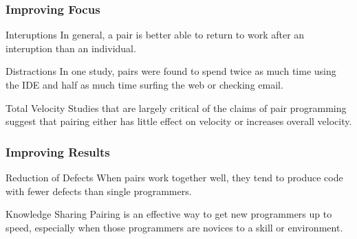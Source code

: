 \begin{frame}
  \frametitle{Improving Focus}
  \begin{block}{Interuptions}
  In general, a pair is better able to return to work after an interuption than an individual\cite{6227110}. 
  \end{block} 
  \begin{block}{Distractions}
  In one study, pairs were found to spend twice as much time using the IDE and half as much time surfing the web or checking email\cite{854064}.
  \end{block}
  \begin{block}{Total Velocity}
  Studies that are largely critical of the claims of pair programming suggest that pairing either has little effect on velocity or increases overall velocity\cite{1553595}.
  \end{block}
\end{frame}

\begin{frame}
  \frametitle{Improving Results}
  \begin{block}{Reduction of Defects}
  When pairs work together well, they tend to produce code with fewer defects than single programmers\cite{Canfora20071317}.
  \end{block} 
  \begin{block}{Knowledge Sharing}
  Pairing is an effective way to get new programmers up to speed, especially when those programmers are novices to a skill or environment\cite{5315998}.
  \end{block}
\end{frame}

